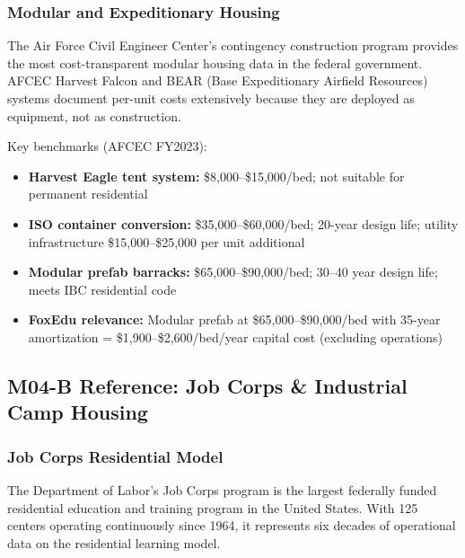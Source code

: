 \documentclass[11pt,letterpaper]{article}
\begin{document}
\subsubsection{Modular and Expeditionary Housing}

The Air Force Civil Engineer Center's contingency construction program provides the most cost-transparent modular housing data in the federal government. AFCEC Harvest Falcon and BEAR (Base Expeditionary Airfield Resources) systems document per-unit costs extensively because they are deployed as equipment, not as construction.

Key benchmarks (AFCEC FY2023):
\begin{itemize}[leftmargin=1.5em]
  \item \textbf{Harvest Eagle tent system:} \$8,000--\$15,000/bed; not suitable for permanent residential
  \item \textbf{ISO container conversion:} \$35,000--\$60,000/bed; 20-year design life; utility infrastructure \$15,000--\$25,000 per unit additional
  \item \textbf{Modular prefab barracks:} \$65,000--\$90,000/bed; 30--40 year design life; meets IBC residential code
  \item \textbf{FoxEdu relevance:} Modular prefab at \$65,000--\$90,000/bed with 35-year amortization = \$1,900--\$2,600/bed/year capital cost (excluding operations)
\end{itemize}

\subsection{M04-B Reference: Job Corps \& Industrial Camp Housing}

\subsubsection{Job Corps Residential Model}

The Department of Labor's Job Corps program is the largest federally funded residential education and training program in the United States. With 125 centers operating continuously since 1964, it represents six decades of operational data on the residential learning model.
\end{document}
